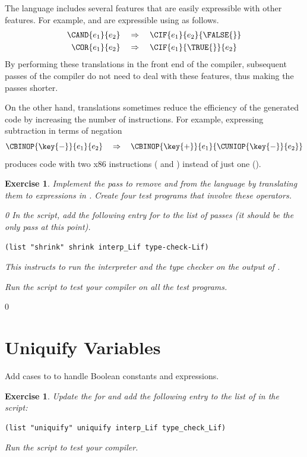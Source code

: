\documentclass[7x10]{TimesAPriori_MIT}%
\def\racketEd{0}
\def\edition{1}
\newtheorem{exercise}[theorem]{Exercise}
\numberwithin{theorem}{chapter}
\numberwithin{definition}{chapter}
\numberwithin{equation}{chapter}
\begin{document}
The \LangIf{} language includes several features that are easily
expressible with other features. For example,  and 
are expressible using  as follows.
\begin{align*}
  \CAND{e_1}{e_2} & \quad \Rightarrow \quad \CIF{e_1}{e_2}{\FALSE{}}\\
  \COR{e_1}{e_2} & \quad \Rightarrow \quad \CIF{e_1}{\TRUE{}}{e_2}
\end{align*}
By performing these translations in the front end of the compiler,
subsequent passes of the compiler do not need to deal with these features,
thus making the passes shorter.

On the other hand, translations sometimes reduce the efficiency of the
generated code by increasing the number of instructions. For example,
expressing subtraction in terms of negation
\[
\CBINOP{\key{-}}{e_1}{e_2} \quad \Rightarrow \quad
  \CBINOP{\key{+}}{e_1}{ \CUNIOP{\key{-}}{e_2} }
\]
produces code with two x86 instructions ( and )
instead of just one ().

\begin{exercise}\normalfont\normalsize
%
Implement the pass  to remove  and  from
the language by translating them to  expressions in \LangIf{}.
%
Create four test programs that involve these operators.
%
{\if\edition\racketEd    
In the  script, add the following entry for
 to the list of passes (it should be the only pass at
this point).
\begin{lstlisting}
(list "shrink" shrink interp_Lif type-check-Lif)
\end{lstlisting}
This instructs  to run the interpreter
 and the type checker  on the
output of .
\fi}
%
Run the script to test your compiler on all the test programs.
\end{exercise}

{\if\edition\racketEd    

\section{Uniquify Variables}
\label{sec:uniquify-Lif}

Add cases to  to handle Boolean constants and
 expressions.

\begin{exercise}\normalfont\normalsize
Update the  for \LangIf{} and add the following
entry to the list of  in the  script:
\begin{lstlisting}
(list "uniquify" uniquify interp_Lif type_check_Lif)
\end{lstlisting}
Run the script to test your compiler.
\end{exercise}

\fi}
\end{document}

